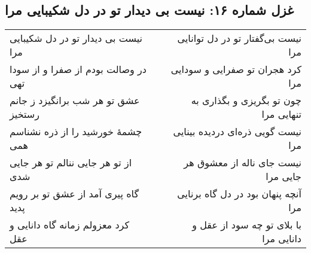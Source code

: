 \begin{center}
\section*{غزل شماره ۱۶: نیست بی دیدار تو در دل شکیبایی مرا}
\label{sec:016}
\begin{longtable}{l p{0.5cm} r}
نیست بی دیدار تو در دل شکیبایی مرا
&&
نیست بی‌گفتار تو در دل توانایی مرا
\\
در وصالت بودم از صفرا و از سودا تهی
&&
کرد هجران تو صفرایی و سودایی مرا
\\
عشق تو هر شب برانگیزد ز جانم رستخیز
&&
چون تو بگریزی و بگذاری به تنهایی مرا
\\
چشمهٔ خورشید را از ذره نشناسم همی
&&
نیست گویی ذره‌ای دردیده بینایی مرا
\\
از تو هر جایی ننالم تو هر جایی شدی
&&
نیست جای ناله از معشوق هر جایی مرا
\\
گاه پیری آمد از عشق تو بر رویم پدید
&&
آنچه پنهان بود در دل گاه برنایی مرا
\\
کرد معزولم زمانه گاه دانایی و عقل
&&
با بلای تو چه سود از عقل و دانایی مرا
\\
\end{longtable}
\end{center}
